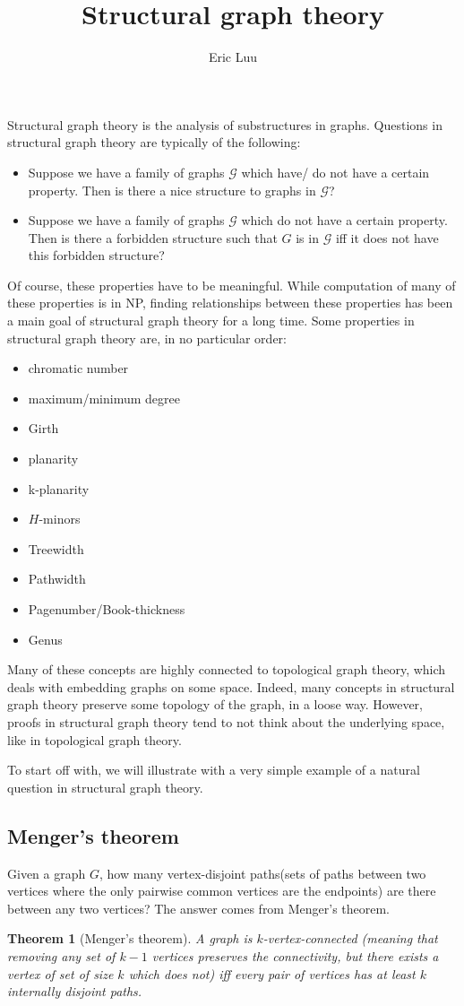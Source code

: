 \documentclass[]{article}
\title{Structural graph theory}
\author{Eric Luu}
\newtheorem{theorem}{Theorem}
\theoremstyle{definition}
\numberwithin{theorem}{section}
\numberwithin{equation}{section}
\begin{document}
Structural graph theory is the analysis of substructures in graphs. Questions in structural graph theory are typically of the following:

\begin{itemize}
	\item Suppose we have a family of graphs $\mathcal{G}$ which have/ do not have a certain property. Then is there a nice structure to graphs in $\mathcal{G}$?
	\item Suppose we have a family of graphs $\mathcal{G}$ which do not have a certain property. Then is there a forbidden structure such that $G$ is in $\mathcal{G}$ iff it does not have this forbidden structure?
\end{itemize}
Of course, these properties have to be meaningful. While computation of many of these properties is in NP, finding relationships between these properties has been a main goal of structural graph theory for a long time. 
Some properties in structural graph theory are, in no particular order:

\begin{itemize}
	\item chromatic number
	\item maximum/minimum degree
	\item Girth
	\item planarity
	\item k-planarity
	\item $H$-minors
	\item Treewidth
	\item Pathwidth
	\item Pagenumber/Book-thickness
	\item Genus
\end{itemize}
Many of these concepts are highly connected to topological graph theory, which deals with embedding graphs on some space. Indeed, many concepts in structural graph theory preserve some topology of the graph, in a loose way. However, proofs in structural graph theory tend to not think about the underlying space, like in topological graph theory.

To start off with, we will illustrate with a very simple example of a natural question in structural graph theory. 

\subsection{Menger's theorem}
Given a graph $G$, how many vertex-disjoint paths(sets of paths between two vertices where the only pairwise common vertices are the endpoints) are there between any two vertices? The answer comes from Menger's theorem.
\begin{theorem}[Menger's theorem]
	A graph is $k$-vertex-connected (meaning that removing any set of $k-1$ vertices preserves the connectivity, but there exists a vertex of set of size $k$ which does not) iff every pair of vertices has at least $k$ internally disjoint paths.
\end{theorem}
\end{document}
